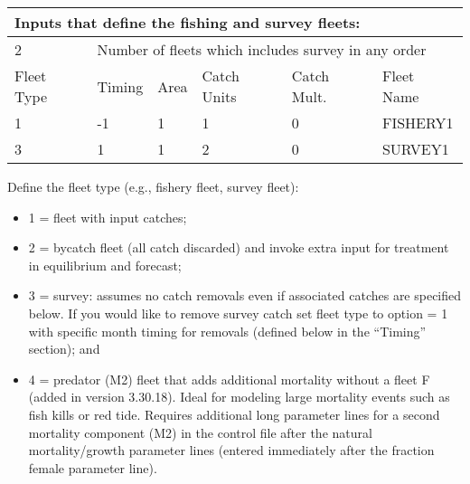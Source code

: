 \begin{center}
	\begin{tabular}{p{2cm} p{2cm} p{2cm} p{2cm} p{2cm} p{4cm} }
		\multicolumn{6}{l}{Inputs that define the fishing and survey fleets:}\\
		\hline
		2 & \multicolumn{5}{l}{Number of fleets which includes survey in any order} \Tstrut\Bstrut\\

		\hline
		Fleet Type & Timing & Area & Catch Units & Catch Mult. & Fleet Name \Tstrut\Bstrut\\

		\hline
		1 & -1 & 1 & 1 & 0 & FISHERY1 \Tstrut\\
		3 &  1 & 1 & 2 & 0 & SURVEY1 \Bstrut\\
		\hline
		
	\end{tabular}
\end{center}

Define the fleet type (e.g., fishery fleet, survey fleet):
	  \begin{itemize}
	  	\item 1 = fleet with input catches;
	  	\item 2 = bycatch fleet (all catch discarded) and invoke extra input for treatment in equilibrium and forecast;
	  	\item 3 = survey: assumes no catch removals even if associated catches are specified below.  If you would like to remove survey catch set fleet type to option = 1 with specific month timing for removals (defined below in the ``Timing'' section); and 
	  	\item 4 = predator (M2) fleet that adds additional mortality without a fleet F (added in version 3.30.18). Ideal for modeling large mortality events such as fish kills or red tide. Requires additional long parameter lines for a second mortality component (M2) in the control file after the natural mortality/growth parameter lines (entered immediately after the fraction female parameter line).
	  \end{itemize}

